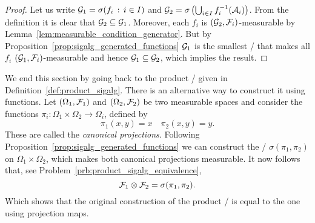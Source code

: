 \begin{proof}
Let us write $\mathcal G_1 = \sigma(f_i \, : \, i \in I)$ and $\mathcal G_2 = \sigma\left(\bigcup_{i \in I} f_i^{-1}(\mathcal A_i)\right)$. From the definition it is clear that $\mathcal G_2 \subseteq \mathcal G_1$. Moreover, each $f_i$ is $(\mathcal G_2, \mathcal F_i)$-measurable by Lemma~\ref{lem:measurable_condition_generator}. But by Proposition~\ref{prop:sigalg_generated_functions} $\mathcal G_1$ is the smallest \sigalg/ that makes all $f_i$ $(\mathcal G_1, \mathcal F_i)$-measurable and hence $\mathcal G_1 \subseteq \mathcal G_2$, which implies the result.
\end{proof}

We end this section by going back to the product \sigalg/ given in Definition~\ref{def:product_sigalg}. There is an alternative way to construct it using functions. Let $(\Omega_1, \mathcal F_1)$ and $(\Omega_2, \mathcal F_2)$ be two measurable spaces and consider the functions $\pi_i : \Omega_1 \times \Omega_2 \to \Omega_i$, defined by 
\[
	\pi_1(x,y) = x \quad \pi_2(x,y) = y.
\]
These are called the \emph{canonical projections}. Following Proposition~\ref{prop:sigalg_generated_functions} we can construct the \sigalg/ $\sigma(\pi_1, \pi_2)$ on $\Omega_1 \times \Omega_2$, which makes both canonical projections measurable. It now follows that, see Problem~\ref{prb:product_sigalg_equivalence},
\begin{equation}\label{eq:product_sigalg_equivalence}
	\mathcal F_1 \otimes \mathcal F_2 = \sigma(\pi_1, \pi_2).
\end{equation}
Which shows that the original construction of the product \sigalg/ is equal to the one using projection maps.

%
%

